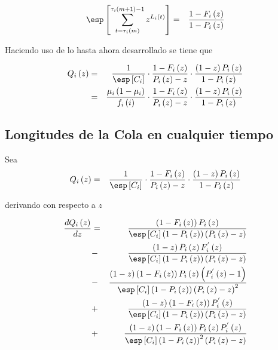 \begin{eqnarray*}
\esp\left[\sum_{t=\tau_{i}\left(m\right)}^{\tau_{i}\left(m+1\right)-1}z^{L_{i}\left(t\right)}\right]&=&\frac{1-F_{i}\left(z\right)}{1-P_{i}\left(z\right)}
\end{eqnarray*}

Haciendo uso de lo hasta ahora desarrollado se tiene que

\begin{eqnarray*}
Q_{i}\left(z\right)&=&\frac{1}{\esp\left[C_{i}\right]}\cdot\frac{1-F_{i}\left(z\right)}{P_{i}\left(z\right)-z}\cdot\frac{\left(1-z\right)P_{i}\left(z\right)}{1-P_{i}\left(z\right)}\\
&=&\frac{\mu_{i}\left(1-\mu_{i}\right)}{f_{i}\left(i\right)}\cdot\frac{1-F_{i}\left(z\right)}{P_{i}\left(z\right)-z}\cdot\frac{\left(1-z\right)P_{i}\left(z\right)}{1-P_{i}\left(z\right)}
\end{eqnarray*}


\subsection{Longitudes de la Cola en cualquier tiempo}
Sea 
\begin{eqnarray*}
Q_{i}\left(z\right)&=&\frac{1}{\esp\left[C_{i}\right]}\cdot\frac{1-F_{i}\left(z\right)}{P_{i}\left(z\right)-z}\cdot\frac{\left(1-z\right)P_{i}\left(z\right)}{1-P_{i}\left(z\right)}
\end{eqnarray*}

derivando con respecto a $z$



\begin{eqnarray*}
\frac{d Q_{i}\left(z\right)}{d z}&=&\frac{\left(1-F_{i}\left(z\right)\right)P_{i}\left(z\right)}{\esp\left[C_{i}\right]\left(1-P_{i}\left(z\right)\right)\left(P_{i}\left(z\right)-z\right)}\\
&-&\frac{\left(1-z\right)P_{i}\left(z\right)F_{i}^{'}\left(z\right)}{\esp\left[C_{i}\right]\left(1-P_{i}\left(z\right)\right)\left(P_{i}\left(z\right)-z\right)}\\
&-&\frac{\left(1-z\right)\left(1-F_{i}\left(z\right)\right)P_{i}\left(z\right)\left(P_{i}^{'}\left(z\right)-1\right)}{\esp\left[C_{i}\right]\left(1-P_{i}\left(z\right)\right)\left(P_{i}\left(z\right)-z\right)^{2}}\\
&+&\frac{\left(1-z\right)\left(1-F_{i}\left(z\right)\right)P_{i}^{'}\left(z\right)}{\esp\left[C_{i}\right]\left(1-P_{i}\left(z\right)\right)\left(P_{i}\left(z\right)-z\right)}\\
&+&\frac{\left(1-z\right)\left(1-F_{i}\left(z\right)\right)P_{i}\left(z\right)P_{i}^{'}\left(z\right)}{\esp\left[C_{i}\right]\left(1-P_{i}\left(z\right)\right)^{2}\left(P_{i}\left(z\right)-z\right)}
\end{eqnarray*}

